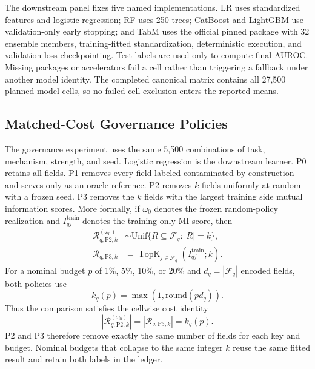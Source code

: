 \documentclass[sigconf,review]{acmart}
\begin{document}
The downstream panel fixes five named implementations. LR uses standardized
features and logistic regression; RF uses 250 trees; CatBoost and LightGBM use
validation-only early stopping; and TabM uses the official pinned package with
32 ensemble members, training-fitted standardization, deterministic execution,
and validation-loss checkpointing. Test labels are used only to compute final
AUROC. Missing packages or accelerators fail a cell rather than triggering a
fallback under another model identity. The completed canonical matrix contains
all 27,500 planned model cells, so no failed-cell exclusion enters the reported
means.

\subsection{Matched-Cost Governance Policies}

The governance experiment uses the same 5,500 combinations of task, mechanism,
strength, and seed. Logistic regression is the downstream learner. P0 retains
all fields. P1 removes every field labeled contaminated by construction and
serves only as an oracle reference. P2 removes $k$ fields uniformly at random
with a frozen seed.
P3 removes the $k$ fields with the largest training side mutual information
scores. More formally, if $\omega_0$ denotes the frozen random-policy
realization and $I_{qj}^{\mathrm{train}}$ denotes the training-only MI score,
then
\begin{align}
 \mathcal{R}_{q,\mathrm{P2},k}^{(\omega_0)}
 &\sim \mathrm{Unif}\{R\subseteq\mathcal{F}_q:|R|=k\},
 \label{eq:p2}\\
 \mathcal{R}_{q,\mathrm{P3},k}
 &=\operatorname{TopK}_{j\in\mathcal{F}_q}
 \left(I_{qj}^{\mathrm{train}};k\right).
 \label{eq:p3}
\end{align}
For a nominal budget $p$ of 1\%, 5\%, 10\%, or 20\% and
$d_q=|\mathcal{F}_q|$ encoded fields, both policies use
\begin{equation}
  k_q(p)=\max\!\left(1,\mathrm{round}(p d_q)\right).
  \label{eq:budget}
\end{equation}
Thus the comparison satisfies the cellwise cost identity
\begin{equation}
 |\mathcal{R}_{q,\mathrm{P2},k}^{(\omega_0)}|
 =|\mathcal{R}_{q,\mathrm{P3},k}|=k_q(p).
 \label{eq:matched-cost}
\end{equation}
P2 and P3 therefore remove exactly the same number of fields for each key and
budget. Nominal budgets that collapse to the same integer $k$ reuse the same
fitted result and retain both labels in the ledger.
\end{document}

